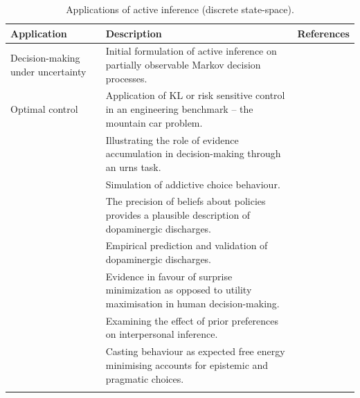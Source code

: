 \documentclass{article}
\begin{document}
\begin{longtabu} to \textwidth {
    X[2,c]
    X[4,c]
    X[1,c]}
    \caption{Applications of active inference (discrete state-space).} \label{table:1} \\
            \toprule
            Application & Description & References \\
            \midrule
            Decision-making under uncertainty
            & Initial formulation of active inference on partially observable Markov decision processes.
            & \cite{fristonActiveInferenceAgency2012}  \\ \addlinespace[0.3cm]
            Optimal control
            &  {Application of KL or risk sensitive control in an engineering benchmark – the mountain car problem.}
            &  {\cite{fristonWhatValueAccumulated2012,catalBayesianPolicySelection2019}} \\ 
            &	 {Illustrating the role of evidence accumulation in decision-making through an urns task.}
            &	 {\cite{fitzgeraldActiveInferenceEvidence2015, fitzgeraldPrecisionNeuronalDynamics2015} }\\ 
            &  {Simulation of addictive choice behaviour.}
            &  {\cite{schwartenbeckOptimalInferenceSuboptimal2015}} \\ 
            &  {The precision of beliefs about policies provides a plausible description of dopaminergic discharges.}
            &  {\cite{fitzgeraldDopamineRewardLearning2015,fristonAnatomyChoiceDopamine2014}} \\ 
            &	 {Empirical prediction and validation of dopaminergic discharges.}
            &  {\cite{schwartenbeckDopaminergicMidbrainEncodes2015}}\\ 
            &  {Evidence in favour of surprise minimization as opposed to utility maximisation in human decision-making.}
            &  {\cite{schwartenbeckEvidenceSurpriseMinimization2015}}\\ 
            &  {Examining the effect of prior preferences on interpersonal inference.}
            &  {\cite{moutoussisFormalModelInterpersonal2014}}\\  &  {Casting behaviour as expected free energy minimising accounts for epistemic and pragmatic choices.} &  {\cite{fristonActiveInferenceEpistemic2015}}\\ \addlinespace[0.3cm]

\end{longtabu}
\end{document}
